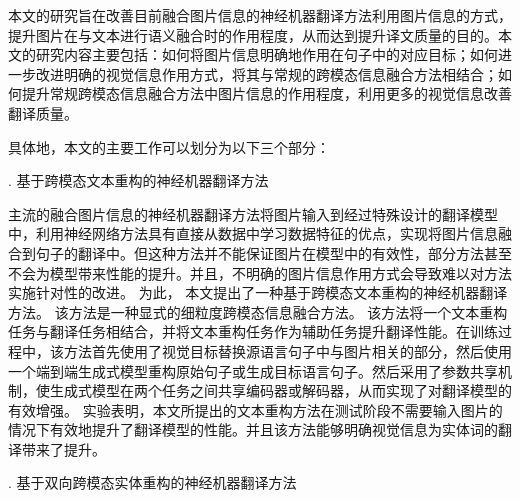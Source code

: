 本文的研究旨在改善目前融合图片信息的神经机器翻译方法利用图片信息的方式，提升图片在与文本进行语义融合时的作用程度，从而达到提升译文质量的目的。本文的研究内容主要包括：如何将图片信息明确地作用在句子中的对应目标；如何进一步改进明确的视觉信息作用方式，将其与常规的跨模态信息融合方法相结合；如何提升常规跨模态信息融合方法中图片信息的作用程度，利用更多的视觉信息改善翻译质量。

具体地，本文的主要工作可以划分为以下三个部分：

{. 基于跨模态文本重构的神经机器翻译方法}

主流的融合图片信息的神经机器翻译方法将图片输入到经过特殊设计的翻译模型中，利用神经网络方法具有直接从数据中学习数据特征的优点，实现将图片信息融合到句子的翻译中。但这种方法并不能保证图片在模型中的有效性，部分方法甚至不会为模型带来性能的提升。并且，不明确的图片信息作用方式会导致难以对方法实施针对性的改进。
为此，%
本文提出了一种基于跨模态文本重构的神经机器翻译方法。
该方法是一种显式的细粒度跨模态信息融合方法。%
该方法将一个文本重构任务与翻译任务相结合，并将文本重构任务作为辅助任务提升翻译性能。在训练过程中，该方法首先使用了视觉目标替换源语言句子中与图片相关的部分，然后使用一个端到端生成式模型重构原始句子或生成目标语言句子。然后采用了参数共享机制，使生成式模型在两个任务之间共享编码器或解码器，从而实现了对翻译模型的有效增强。
实验表明，本文所提出的文本重构方法在测试阶段不需要输入图片的情况下有效地提升了翻译模型的性能。并且该方法能够明确视觉信息为实体词的翻译带来了提升。

{. 基于双向跨模态实体重构的神经机器翻译方法}

